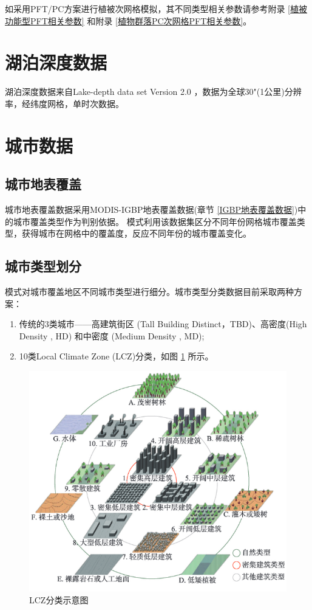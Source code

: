 如采用PFT/PC方案进行植被次网格模拟，其不同类型相关参数请参考附录 \ref{植被功能型PFT相关参数} 和附录 \ref{植物群落PC次网格PFT相关参数}。


\section{湖泊深度数据}\label{湖泊深度数据}
湖泊深度数据来自Lake-depth data set Version 2.0 \citep{kourzeneva2012global}，数据为全球30"(1公里)分辨率，经纬度网格，单时次数据。

\section{城市数据}\label{城市数据}
\subsection{城市地表覆盖}\label{城市地表覆盖}
城市地表覆盖数据采用MODIS-IGBP地表覆盖数据(章节 \ref{IGBP地表覆盖数据})中的城市覆盖类型作为判别依据。
模式利用该数据集区分不同年份网格城市覆盖类型，获得城市在网格中的覆盖度，反应不同年份的城市覆盖变化。
\subsection{城市类型划分}\label{城市类型划分}
模式对城市覆盖地区不同城市类型进行细分。城市类型分类数据目前采取两种方案：
\begin{enumerate}
    \item 传统的3类城市——高建筑街区 (Tall Building Distinct，TBD)、高密度(High Density , HD) 和中密度 (Medium Density , MD);
    \item 10类Local Climate Zone (LCZ)分类，如图 \ref{fig:LCZ分类图示}  所示。
\end{enumerate}
{
\begin{figure}[]
\centering
\includegraphics{Figures/地表输入数据/LCZ分类图示.png}
\caption{LCZ分类示意图}
\label{fig:LCZ分类图示}
\end{figure}
}


